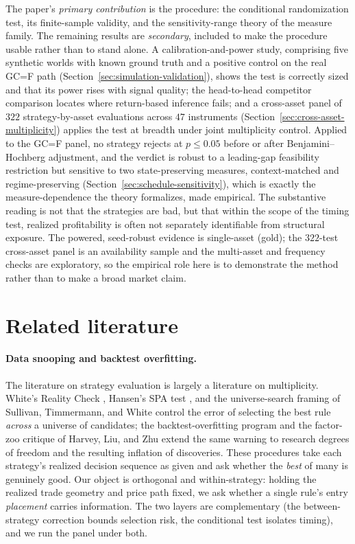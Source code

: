 \documentclass[risks,article,submit,pdftex,oneauthor]{Definitions/mdpi}
\begin{document}
The paper's \emph{primary contribution} is the procedure: the conditional randomization
test, its finite-sample validity, and the sensitivity-range theory of the measure
family. The remaining results are \emph{secondary}, included to make the procedure
usable rather than
to stand alone. A calibration-and-power study, comprising five synthetic worlds with known ground
truth and a positive control on the real GC=F path
(Section~\ref{sec:simulation-validation}), shows the
test is correctly sized and that its power rises with signal quality; the head-to-head
competitor comparison locates where return-based inference fails; and a
cross-asset panel of $322$ strategy-by-asset evaluations across $47$ instruments
(Section~\ref{sec:cross-asset-multiplicity}) applies the test at breadth under joint
multiplicity control. Applied to the GC=F panel, no strategy rejects at $p\le0.05$ before
or after Benjamini--Hochberg adjustment, and the verdict is robust to a leading-gap
feasibility restriction but sensitive to two state-preserving measures, context-matched and regime-preserving
(Section~\ref{sec:schedule-sensitivity}), which is exactly the measure-dependence the
theory formalizes, made empirical. The substantive reading is not that the
strategies are bad, but that within the scope of the timing test, realized profitability
is often not separately identifiable from structural exposure. The powered, seed-robust
evidence is single-asset (gold); the $322$-test cross-asset panel is an availability
sample and the multi-asset and frequency checks are exploratory, so the empirical role
here is to demonstrate the method rather than to make a broad market claim.

\section{Related literature}

\paragraph{Data snooping and backtest overfitting.} The literature on strategy
evaluation is largely a literature on multiplicity. White's Reality Check
\citep{white2000}, Hansen's SPA test \citep{hansen2005}, and the universe-search framing of
Sullivan, Timmermann, and White \citep{sullivan1999} control the error of selecting the
best rule \emph{across} a universe of candidates; the backtest-overfitting program
\citep{bailey2017,baileylopez2014,lopezdeprado2018} and the factor-zoo critique of
Harvey, Liu, and Zhu \citep{harveyliuzhu2016} extend the same warning to research degrees
of freedom and the resulting inflation of discoveries. These procedures take each
strategy's realized decision sequence as given and ask whether the \emph{best} of many is
genuinely good. Our object is orthogonal and within-strategy: holding the realized trade
geometry and price path fixed, we ask whether a single rule's entry \emph{placement}
carries information. The two layers are complementary (the between-strategy correction
bounds selection risk, the conditional test isolates timing), and we run the panel under
both.
\end{document}
